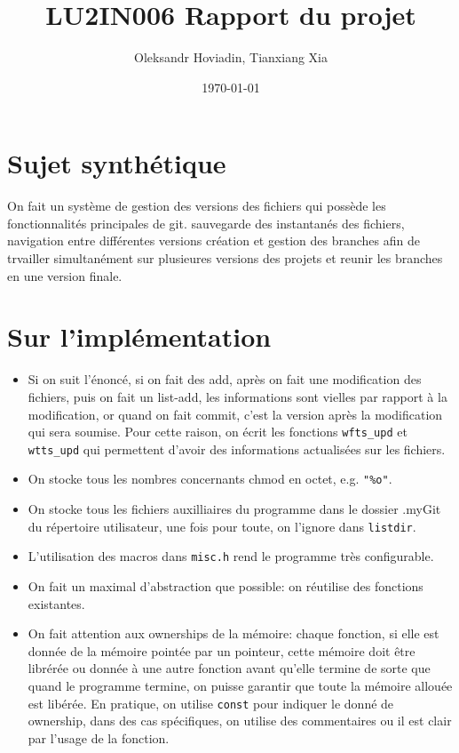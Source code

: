 \documentclass{report}
\title{LU2IN006 Rapport du projet}
\author{Oleksandr Hoviadin, Tianxiang Xia}
\date{\today}
\begin{document}
\maketitle
\section{Sujet synthétique}
On fait un système de gestion des versions des fichiers
qui possède les fonctionnalités principales de git. sauvegarde des instantanés
des fichiers, navigation entre différentes versions
création et gestion des branches afin de trvailler simultanément
sur plusieures versions des projets et reunir les branches
en une version finale.

\section{Sur l'implémentation}
\begin{itemize}
  \item Si on suit l'énoncé, si on fait des add, après on fait une modification des fichiers,
  puis on fait un list-add, les informations sont vielles par rapport à la modification, or quand on
  fait commit, c'est la version après la modification qui sera soumise. Pour cette raison, on écrit les
  fonctions \verb|wfts_upd| et \verb|wtts_upd| qui permettent d'avoir des informations actualisées sur
  les fichiers.
  \item On stocke tous les nombres concernants chmod en octet, e.g. \verb|"%o"|.
  \item On stocke tous les fichiers auxilliaires du programme dans le dossier .myGit
  du répertoire utilisateur, une fois pour toute, on l'ignore dans \verb|listdir|.
  \item L'utilisation des macros dans \verb|misc.h| rend le programme très configurable.
  \item On fait un maximal d'abstraction que possible: on réutilise des fonctions existantes.
  \item On fait attention aux ownerships de la mémoire: chaque fonction, si elle est donnée de la mémoire pointée
  par un pointeur, cette mémoire doit être librérée ou donnée à une autre fonction avant qu'elle termine de sorte
  que quand le programme termine, on puisse garantir que toute la mémoire allouée est libérée. En pratique, on utilise
  \verb|const| pour indiquer le donné de ownership, dans des cas spécifiques, on utilise des commentaires ou il est
  clair par l'usage de la fonction.
\end{itemize}
\end{document}
